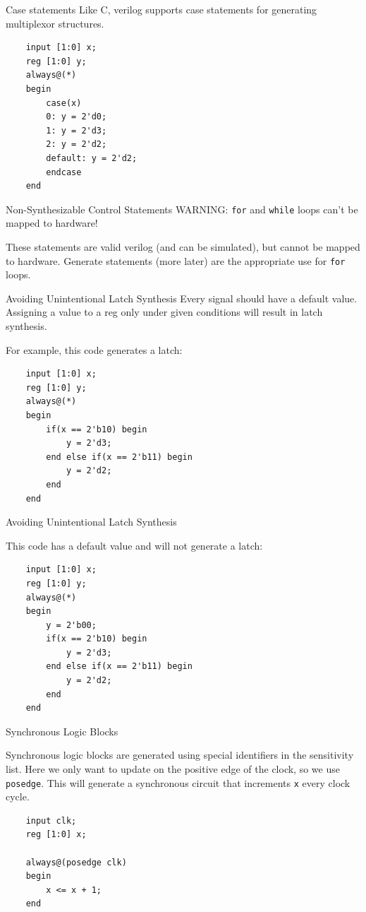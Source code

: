 \documentclass{beamer}
\begin{document}
\begin{frame}[fragile]{Case statements}
	Like C, verilog supports case statements for generating multiplexor structures.

\begin{verbatim}
	input [1:0] x;
	reg [1:0] y;
	always@(*)
	begin
		case(x)
		0: y = 2'd0;
		1: y = 2'd3;
		2: y = 2'd2;
		default: y = 2'd2;
		endcase
	end
\end{verbatim}

\end{frame}

\begin{frame}[fragile]{Non-Synthesizable Control Statements}
	WARNING: \texttt{for} and \texttt{while} loops can't be mapped to hardware!

	These statements are valid verilog (and can be simulated), but cannot be mapped to hardware.
	Generate statements (more later) are the appropriate use for \texttt{for} loops.
\end{frame}

\begin{frame}[fragile]{Avoiding Unintentional Latch Synthesis}
	Every signal should have a default value.
	Assigning a value to a reg only under given conditions will result in latch synthesis.

	For example, this code generates a latch:

\begin{verbatim}
	input [1:0] x;
	reg [1:0] y;
	always@(*)
	begin
		if(x == 2'b10) begin
			y = 2'd3;
		end else if(x == 2'b11) begin
			y = 2'd2;
		end
	end
\end{verbatim}

\end{frame}

\begin{frame}[fragile]{Avoiding Unintentional Latch Synthesis}

	This code has a default value and will not generate a latch:

\begin{verbatim}
	input [1:0] x;
	reg [1:0] y;
	always@(*)
	begin
		y = 2'b00;
		if(x == 2'b10) begin
			y = 2'd3;
		end else if(x == 2'b11) begin
			y = 2'd2;
		end
	end
\end{verbatim}

\end{frame}

\begin{frame}[fragile]{Synchronous Logic Blocks}

	Synchronous logic blocks are generated using special identifiers in the sensitivity list.
	Here we only want to update on the positive edge of the clock, so we use \texttt{posedge}.
	This will generate a synchronous circuit that increments \texttt{x} every clock cycle.

\begin{verbatim}
	input clk;
	reg [1:0] x;

	always@(posedge clk)
	begin
		x <= x + 1;
	end
\end{verbatim}

\end{frame}
\end{document}
